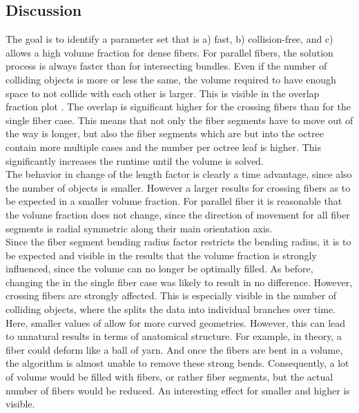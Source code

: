 \subsection{Discussion}
% 
The goal is to identify a parameter set that is a) fast, b) collision-free, and c) allows a high volume fraction for dense fibers.
For parallel fibers, the solution process is always faster than for intersecting bundles.
Even if the number of colliding objects is more or less the same, the volume required to have enough space to not collide with each other is larger.
This is visible in the overlap fraction plot \dummy{}.
The overlap is significant higher for the crossing fibers than for the single fiber case.
This means that not only the fiber segments have to move out of the way is longer, but also the fiber segments which are but into the octree contain more multiple cases and the number per octree leaf is higher.
This significantly increases the runtime until the volume is solved.
\\
% 
The behavior in change of the length factor \segLengthFactor{} is clearly a time advantage, since also the number of objects is smaller.
However a larger \segLengthFactor{} results for crossing fibers as to be expected in a smaller volume fraction.
For parallel fiber it is reasonable that the volume fraction does not change, since the direction of movement for all fiber segments is radial symmetric along their main orientation axis.
\\
% 
Since the fiber segment bending radius factor \segRadiusFactor{} restricts the bending radius, it is to be expected and visible in the results that the volume fraction is strongly influenced, since the volume can no longer be optimally filled.
As before, changing the \segRadiusFactor{} in the single fiber case was likely to result in no difference.
However, crossing fibers are strongly affected.
This is especially visible in the number of colliding objects, where the \segRadiusFactor{} splits the data into individual branches over time.
Here, smaller values of \segRadiusFactor{} allow for more curved geometries.
However, this can lead to unnatural results in terms of anatomical structure.
For example, in theory, a fiber could deform like a ball of yarn.
And once the fibers are bent in a volume, the algorithm is almost unable to remove these strong bends.
Consequently, a lot of volume would be filled with fibers, or rather fiber segments, but the actual number of fibers would be reduced.
An interesting effect for smaller \segLengthFactor{} and higher \segRadiusFactor{} is visible.
